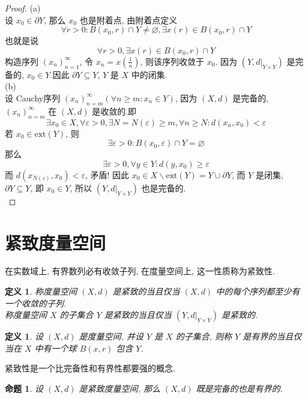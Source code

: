 \documentclass[12pt, a4paper, oneside]{ctexart}
\newtheorem{definition}[theorem]{定义}
\newtheorem{proposition}[theorem]{命题}
\begin{document}
\begin{proof}
    (a)\\
    设 $x_0\in\partial Y$, 那么 $x_0$ 也是附着点, 由附着点定义
    $$
        \forall r > 0 : B(x_0, r) \cap Y\neq\varnothing, \exists x(r) \in B(x_0, r) \cap Y
    $$
    也就是说
    $$
        \forall r > 0, \exists x(r) \in B(x_0, r)\cap Y
    $$
    构造序列 $(x_n)_{n=1}^{\infty}$, 令 $x_n=x(\frac{1}{n})$, 则该序列收敛于 $x_0$.
    因为 $(Y,d|_{Y\times Y})$ 是完备的, $x_0\in Y$.因此 $\partial Y\subseteq Y$, $Y$ 是 $X$ 中的闭集.\\
    (b)\\
    设 Cauchy序列 $(x_n)_{n=m}^{\infty} (\forall n\geq m:x_n\in Y)$, 因为 $(X, d)$ 是完备的, $(x_n)_{n=m}^{\infty}$ 在 $(X, d)$ 是收敛的.即
    $$
        \exists x_0\in X, \forall \varepsilon > 0, \exists N = N(\varepsilon) \geq m, \forall n \geq N : d(x_n, x_0) < \varepsilon
    $$
    若 $x_0\in \text{ext}(Y)$, 则
    $$
        \exists \varepsilon > 0 : B(x_0, \varepsilon)\cap Y=\varnothing
    $$
    那么
    $$
        \exists \varepsilon > 0, \forall y\in Y : d(y, x_0) \geq \varepsilon
    $$
    而 $d(x_{N(\varepsilon)}, x_0)<\varepsilon$, 矛盾! 因此 $x_0\in X\backslash \text{ext}(Y)=Y\cup \partial Y$, 
    而 $Y$ 是闭集, $\partial Y\subseteq Y$, 即 $x_0\in Y$, 所以 $(Y,d|_{Y\times Y})$ 也是完备的.\\
\end{proof}

\section{紧致度量空间}

在实数域上, 有界数列必有收敛子列, 在度量空间上, 这一性质称为紧致性.

\begin{definition}
    称度量空间 $(X,d)$ 是紧致的当且仅当 $(X, d)$ 中的每个序列都至少有一个收敛的子列.\\
    称度量空间 $X$ 的子集合 $Y$ 是紧致的当且仅当 $(Y,d|_{Y\times Y})$ 是紧致的.
\end{definition}

\begin{definition}
    设 $(X, d)$ 是度量空间, 并设 $Y$ 是 $X$ 的子集合, 则称 $Y$ 是有界的当且仅当在 $X$ 中有一个球 $B(x, r)$ 包含 $Y$.
\end{definition}

紧致性是一个比完备性和有界性都要强的概念.

\begin{proposition}
    设 $(X, d)$ 是紧致度量空间, 那么 $(X,d)$ 既是完备的也是有界的.
\end{proposition}
\end{document}
